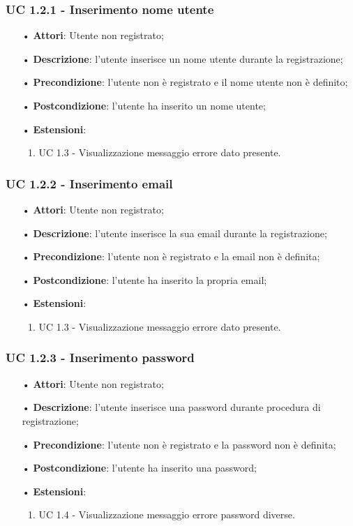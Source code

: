 \subsubsection{UC 1.2.1 - Inserimento nome utente}
\begin{itemize}
	\item[•]\textbf{Attori}: Utente non registrato;
	\item[•]\textbf{Descrizione}: l'utente inserisce un nome utente durante la registrazione;
	\item[•]\textbf{Precondizione}: l'utente non è registrato e il nome utente non è definito;
	\item[•]\textbf{Postcondizione}: l'utente ha inserito un nome utente;
	\item[•] \textbf{Estensioni}:
	\begin{enumerate}
		\item UC 1.3 - Visualizzazione messaggio errore dato presente.
	\end{enumerate}
\end{itemize}

\subsubsection{UC 1.2.2 - Inserimento email}
\begin{itemize}
	\item[•]\textbf{Attori}: Utente non registrato;
	\item[•]\textbf{Descrizione}: l'utente inserisce la sua email durante la registrazione;
	\item[•]\textbf{Precondizione}: l'utente non è registrato e la email non è definita;
	\item[•]\textbf{Postcondizione}: l'utente ha inserito la propria email;
	\item[•] \textbf{Estensioni}:
		\begin{enumerate}
		\item UC 1.3 - Visualizzazione messaggio errore dato presente.
	\end{enumerate}
\end{itemize}

\subsubsection{UC 1.2.3 - Inserimento password}
\begin{itemize}
	\item[•]\textbf{Attori}: Utente non registrato;
	\item[•]\textbf{Descrizione}: l'utente inserisce una password durante procedura di registrazione;
	\item[•]\textbf{Precondizione}: l'utente non è registrato e la password non è definita;
	\item[•]\textbf{Postcondizione}: l'utente ha inserito una password;
	\item[•] \textbf{Estensioni}:
	\begin{enumerate}
		\item UC 1.4 - Visualizzazione messaggio errore password diverse.
	\end{enumerate}
\end{itemize}

